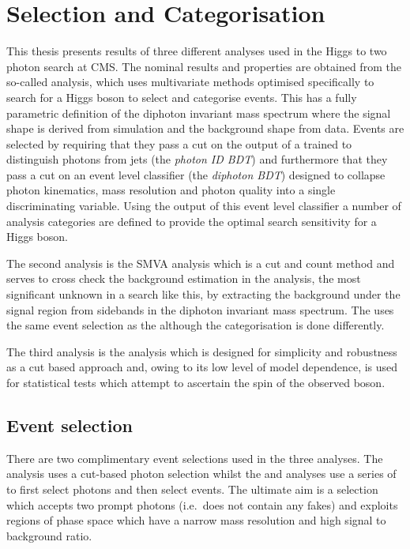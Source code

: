 \chapter{Selection and Categorisation}
\label{chap:selection_and_categorisation}

This thesis presents results of three different analyses used in the Higgs to two photon search at CMS. The nominal results and properties are obtained from the so-called \MFM analysis, which uses multivariate methods optimised specifically to search for a \SM Higgs boson to select and categorise events. This has a fully parametric definition of the diphoton invariant mass spectrum where the signal shape is derived from \MC simulation and the background shape from data. Events are selected by requiring that they pass a cut on the output of a \BDT trained to distinguish photons from jets (the \textit{photon ID BDT}) and furthermore that they pass a cut on an event level classifier (the \textit{diphoton BDT}) designed to collapse photon kinematics, mass resolution and photon quality into a single discriminating variable. Using the output of this event level classifier a number of analysis categories are defined to provide the optimal search sensitivity for a \SM Higgs boson. 

The second analysis is the \acf{SMVA} analysis which is a cut and count method and serves to cross check the background estimation in the \MFM analysis, the most significant unknown in a search like this, by extracting the background under the signal region from sidebands in the diphoton invariant mass spectrum. The \SMVA uses the same event selection as the \MFM although the categorisation is done differently. 

The third analysis is the \CiC analysis which is designed for simplicity and robustness as a cut based approach and, owing to its low level of model dependence, is used for statistical tests which attempt to ascertain the spin of the observed boson.

\section{Event selection}
\label{sec:event_selection}

There are two complimentary event selections used in the three analyses. The \CiC analysis uses a cut-based photon selection whilst the \MFM and \SMVA analyses use a series of \BDTs to first select photons and then select events. The ultimate aim is a selection which accepts two prompt photons (i.e.\ does not contain any fakes) and exploits regions of phase space which have a narrow mass resolution and high signal to background ratio.

